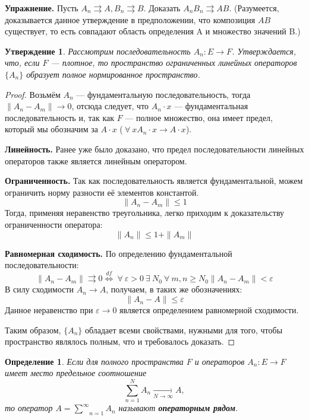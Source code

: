 \documentclass[12pt]{article}
\let\existstemp\exists
\let\foralltemp\forall
\renewcommand{\exists}{\: \existstemp \:}
\renewcommand{\forall}{\: \foralltemp \:}
\newcommand{\equals}{\Leftrightarrow}
\newcommand{\exc}{{\bfseries Упражнение. }}
\newcommand{\norm}[1]{\| #1 \|}
\newcommand{\Sum}[2]{\underset{#1}{\overset{#2}{\sum}}}
\renewcommand{\leq}{\leqslant}
\renewcommand{\geq}{\geqslant}
\newtheorem{defi}{Определение}[section]
\newtheorem{state}{Утверждение}[section] %
\begin{document}
	\exc Пусть $A_n \rightrightarrows A, B_n \rightrightarrows B$. Доказать $A_n B_n \rightrightarrows A B$. 
	(Разумеется, доказывается данное утверждение в предположении, что композиция $A B$ существует, то есть совпадают область определения
	A и множество значений B.)
	
	\begin{state}
		Рассмотрим последовательность $A_n : E \rightarrow F$. Утверждается, что, если $F$ --- плотное, то пространство 
		ограниченных линейных операторов $\{A_n\}$ образует полное нормированное пространство.
	\end{state}
	\begin{proof}
		Возьмём $A_n$ --- фундаментальную последовательность, тогда $\norm{A_n - A_m} \rightarrow 0$, отсюда следует, что 
		$A_n \cdot x$ --- фундаментальная последовательность и, так как $F$ --- полное множество, она имеет предел, который
		мы обозначим за $A \cdot x$ ($\forall x A_n \cdot x \rightarrow A \cdot x$).
		
		\textbf{Линейность.} Ранее уже было доказано, что предел последовательности линейных операторов также является линейным
		оператором.
		
		\textbf{Ограниченность.} Так как последовательность является фундаментальной, можем ограничить норму разности её элементов 
		константой.
		$$\norm{A_n - A_m} \leq 1$$
		Тогда, применяя неравенство треугольника, легко приходим к доказательству ограниченности оператора:
		$$\norm{A_n} \leq 1 + \norm{A_m}$$
		
		\textbf{Равномерная сходимость.} По определению фундаментальной последовательности:
		$$
			\norm{A_n - A_m} \rightrightarrows 0 \overset{df}{\equals} 
			\forall \varepsilon > 0 \exists N_0 \forall m, n \geq N_0 \norm{A_n - A_m} < \varepsilon
		$$
		В силу сходимости $A_n \rightarrow A$, получаем, в таких же обозначениях:
		$$ \norm{A_n - A} \leq \varepsilon $$
		Данное неравенство при $\varepsilon \rightarrow 0$ является определением равномерной сходимости.
		
		Таким образом, $\{A_n\}$ обладает всеми свойствами, нужными для того, чтобы пространство являлось полным, что и требовалось 
		доказать.
	\end{proof}
	
	\begin{defi}
		Если для полного пространства $F$ и операторов $A_n : E \rightarrow F$ имеет место предельное соотношение
		$$\Sum{n=1}{N} A_n \underset{N \rightarrow \infty}{\rightarrow} A,$$
		то оператор $A = \Sum{n=1}{\infty} A_n$ называют \textbf{операторным рядом}.
	\end{defi}
	
\end{document}
